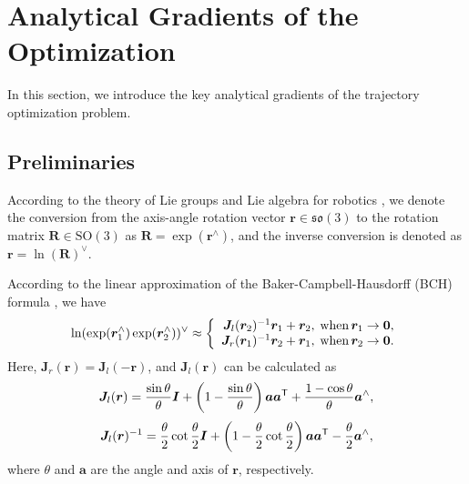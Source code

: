 {\appendices


\section{Analytical Gradients of the Optimization}

In this section, we introduce the key analytical gradients of the trajectory optimization problem.

\subsection{Preliminaries}

According to the theory of Lie groups and Lie algebra for robotics \cite{murray1994mathematical}, we denote the conversion from the axis-angle rotation vector $\bm r \in \mathfrak{so}(3)$ to the rotation matrix $\bm R \in \text{SO}(3)$ as $\bm R = \exp (\bm r^{\wedge})$, and the inverse conversion is denoted as $\bm r = \ln (\bm R)^{\vee}$.

According to the linear approximation of the Baker-Campbell-Hausdorff (BCH) formula \cite{barfoot2024state}, we have
\begin{equation} \label{eq:BCH}
    \ln(\exp(\bm r_1^\wedge)\exp(\bm r_2^\wedge))^\vee \approx
    \left\{\begin{array}{rl}
        \bm J_l(\bm r_2)^{-1} \bm r_1 + \bm r_2, & \hspace{-2mm} \text{when} \, \bm r_1 \rightarrow \bm 0, 
        \\
        \bm J_r(\bm r_1)^{-1} \bm r_2 + \bm r_1, & \hspace{-2mm} \text{when} \, \bm r_2 \rightarrow \bm 0.
    \end{array}\right.
\end{equation}
Here, $\bm J_r(\bm r) = \bm J_l(- \bm r)$, and $\bm J_l(\bm r)$ can be calculated as 
\begin{equation} \label{eq:J_l}
\bm J_l(\bm r) = \frac{\sin \theta}{\theta} \bm I + \left(1-\frac{\sin \theta}{\theta} \right) \bm a \bm a^{\mathsf{T}} + \frac{1-\cos \theta}{\theta} \bm a^{\wedge},
\end{equation}
\begin{equation} \label{eq:J_l_inv}
\bm J_l(\bm r)^{-1} 
= \frac{\theta}{2} \cot \frac{\theta}{2} \bm I 
+ \left(1 - \frac{\theta}{2} \cot \frac{\theta}{2} \right) \bm a \bm a^{\mathsf{T}} 
- \frac{\theta}{2} \bm a^{\wedge},
\end{equation}
where $\theta$ and $\bm a$ are the angle and axis of $\bm r$, respectively.



}
